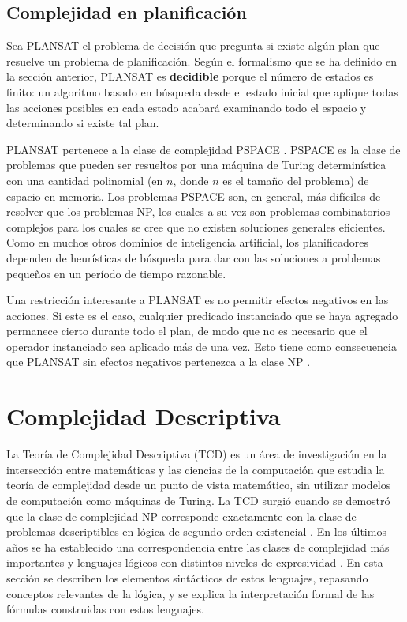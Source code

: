 \subsection{Complejidad en planificación}
Sea PLANSAT el problema de decisión que pregunta si existe algún plan que
resuelve un problema de planificación. Según el formalismo que se ha definido
en la sección anterior,
PLANSAT es \textbf{decidible} porque el número de estados es finito:
un algoritmo basado en búsqueda desde el estado inicial que aplique
todas las acciones posibles en cada estado acabará examinando todo el espacio y
determinando si existe tal plan.

PLANSAT pertenece a la clase de complejidad PSPACE \cite{ghallab:book}.
PSPACE es la clase de problemas que pueden ser resueltos por una máquina de
Turing determinística con una cantidad polinomial (en $n$, donde $n$ es el
tamaño del problema) de espacio en memoria. Los problemas PSPACE son, en
general, más difíciles de resolver que los problemas NP, los cuales a su vez
son problemas combinatorios complejos para los cuales se cree que no existen
soluciones generales eficientes. Como en muchos otros dominios de inteligencia
artificial, los planificadores dependen de
heurísticas de búsqueda para dar con las soluciones a problemas pequeños en un 
período de tiempo razonable.

Una restricción interesante a PLANSAT es no permitir efectos negativos en las
acciones. Si este es el caso, cualquier predicado instanciado que se haya 
agregado permanece cierto durante todo el plan, de modo que no es necesario
que el operador instanciado sea aplicado más de una vez.
Esto tiene como consecuencia que PLANSAT sin efectos 
negativos pertenezca a la clase NP \cite{ghallab:book}.

\section{Complejidad Descriptiva}
La Teoría de Complejidad Descriptiva (TCD) es un área de investigación en la
intersección entre matemáticas y las ciencias de la computación 
que estudia la teoría de complejidad desde un punto de vista matemático, 
sin utilizar modelos de computación como máquinas de Turing. La TCD surgió
cuando se demostró que la clase de complejidad NP corresponde
exactamente con la clase de problemas descriptibles en lógica de segundo orden
existencial \cite{fagin:spectra}. En los últimos años se ha establecido una
correspondencia entre las clases de complejidad más importantes y lenguajes
lógicos con distintos niveles de expresividad \cite{immerman:book}. En esta
sección se describen los elementos sintácticos de estos lenguajes, repasando
conceptos relevantes de la lógica, y se explica la interpretación formal de
las fórmulas construidas con estos lenguajes.

